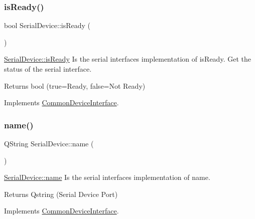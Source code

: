 \hypertarget{class_serial_device_aa2435fb76a612b2ebf1a61287deee85d}{}\label{class_serial_device_aa2435fb76a612b2ebf1a61287deee85d} 
\subsubsection{\texorpdfstring{is\+Ready()}{isReady()}}
{\footnotesize\ttfamily bool Serial\+Device\+::is\+Ready (\begin{DoxyParamCaption}{ }\end{DoxyParamCaption})\hspace{0.3cm}{\ttfamily [virtual]}}



\hyperlink{class_serial_device_aa2435fb76a612b2ebf1a61287deee85d}{Serial\+Device\+::is\+Ready} Is the serial interface\textquotesingle{}s implementation of is\+Ready. Get the status of the serial interface. 

\begin{DoxyReturn}{Returns}
bool (true=Ready, false=Not Ready) 
\end{DoxyReturn}


Implements \hyperlink{class_common_device_interface}{Common\+Device\+Interface}.

\hypertarget{class_serial_device_a97092ec9379ed561866dad21475ea331}{}\label{class_serial_device_a97092ec9379ed561866dad21475ea331} 
\subsubsection{\texorpdfstring{name()}{name()}}
{\footnotesize\ttfamily Q\+String Serial\+Device\+::name (\begin{DoxyParamCaption}{ }\end{DoxyParamCaption})\hspace{0.3cm}{\ttfamily [virtual]}}



\hyperlink{class_serial_device_a97092ec9379ed561866dad21475ea331}{Serial\+Device\+::name} Is the serial interface\textquotesingle{}s implementation of name. 

\begin{DoxyReturn}{Returns}
Qstring (Serial Device Port) 
\end{DoxyReturn}


Implements \hyperlink{class_common_device_interface}{Common\+Device\+Interface}.

